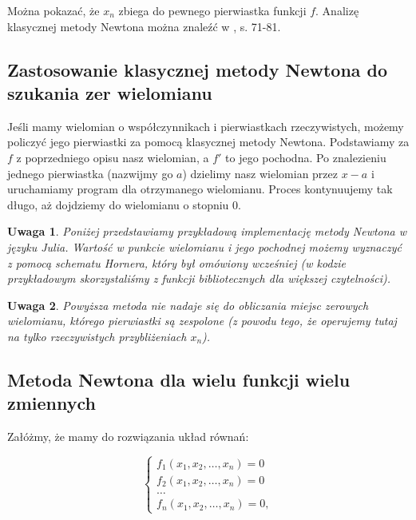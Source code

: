 \documentclass{article}
\newtheorem{remark}{Uwaga}
\begin{document}
Można pokazać, że $x_n$ zbiega do pewnego pierwiastka funkcji $f$. Analizę klasycznej metody Newtona można znaleźć w \cite{kincaid}, s.   71-81.

\subsection{Zastosowanie klasycznej metody Newtona do szukania zer wielomianu}

Jeśli mamy wielomian o współczynnikach i pierwiastkach rzeczywistych, możemy policzyć jego pierwiastki za pomocą klasycznej metody Newtona. Podstawiamy za $f$ z poprzedniego opisu nasz wielomian, a $f'$ to jego pochodna. Po znalezieniu jednego pierwiastka (nazwijmy go $a$) dzielimy nasz wielomian przez $x-a$ i uruchamiamy program dla otrzymanego wielomianu. Proces kontynuujemy tak długo, aż dojdziemy do wielomianu o stopniu $0$.

\begin{remark}
Poniżej przedstawiamy przykładową implementację metody Newtona w języku Julia. Wartość w punkcie wielomianu i jego pochodnej możemy wyznaczyć z pomocą schematu Hornera, który był omówiony wcześniej (w kodzie przykładowym skorzystaliśmy z funkcji bibliotecznych dla większej czytelności).
\end{remark}


\lstset{language=Julia, label=DescriptiveLabel, frame=shadowbox}


\begin{remark}
Powyższa metoda nie nadaje się do obliczania miejsc zerowych wielomianu, którego pierwiastki są zespolone (z powodu tego, że operujemy tutaj na tylko rzeczywistych przybliżeniach $x_n$).
\end{remark}

\subsection{Metoda Newtona dla wielu funkcji wielu zmiennych}

Załóżmy, że mamy do rozwiązania układ równań:

$$\left\{\begin{matrix}
f_1(x_1, x_2, \ldots, x_n) = 0 \\ 
f_2(x_1, x_2, \ldots, x_n) = 0 \\ 
\ldots\\ 
f_n(x_1, x_2, \ldots, x_n) = 0,
\end{matrix}\right.$$
\end{document}
